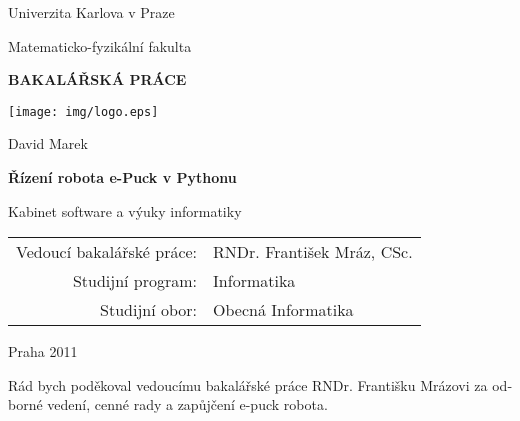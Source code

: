 

\pagestyle{empty}
\begin{center}

\large

Univerzita Karlova v Praze

\medskip

Matematicko-fyzikální fakulta

\vfill

{\bf\Large BAKALÁŘSKÁ PRÁCE}

\vfill

\centerline{\mbox{\texttt{[image: img/logo.eps]}}}

\vfill
\vspace{5mm}

{\LARGE David Marek}

\vspace{15mm}

{\LARGE\bfseries Řízení robota e-Puck v Pythonu}

\vfill

Kabinet software a výuky informatiky

\vfill

\begin{tabular}{rl}

Vedoucí bakalářské práce: & RNDr. František Mráz, CSc.\\
\noalign{\vspace{2mm}}
Studijní program: & Informatika \\
\noalign{\vspace{2mm}}
Studijní obor: & Obecná Informatika \\
\end{tabular}

\vfill

Praha 2011

\end{center}

\newpage



\openright

\noindent
\begin{otherlanguage}{czech}
Rád bych poděkoval vedoucímu bakalářské práce RNDr. Františku Mrázovi za
odborné vedení, cenné rady a zapůjčení e-puck robota.
\end{otherlanguage}

